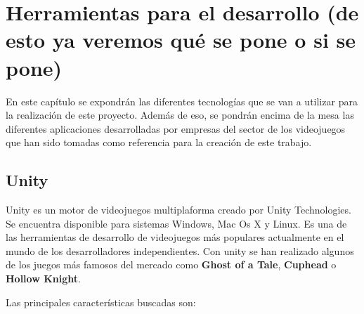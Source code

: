 
\section{Herramientas para el desarrollo (de esto ya veremos qu\'e se pone o si se pone)}
\label{cap2:sec:herramientas}

En este cap\'itulo se expondr\'an las diferentes tecnolog\'ias que se van a utilizar para la realizaci\'on de este proyecto. Adem\'as de eso, se pondr\'an encima de la mesa las diferentes aplicaciones desarrolladas por empresas del sector de los videojuegos que han sido tomadas como referencia para la creaci\'on de este trabajo. 
\subsection{Unity}
\label{cap2:subsec:unity}

Unity es un motor de videojuegos multiplaforma creado por Unity Technologies. Se encuentra disponible para sistemas Windows, Mac Os X y Linux. Es una de las herramientas de desarrollo de videojuegos m\'as populares actualmente en el mundo de los desarrolladores independientes. Con unity se han realizado algunos de los juegos m\'as famosos del mercado como \textbf{Ghost of a Tale}, \textbf{Cuphead} o  \textbf{Hollow Knight}.

Las principales caracter\'isticas buscadas son:


